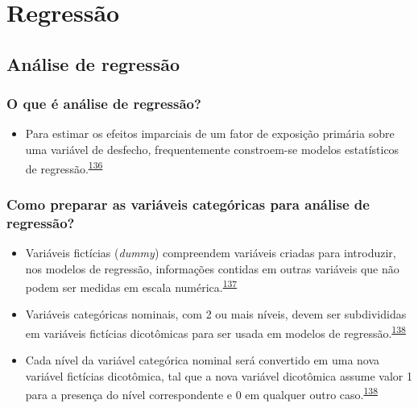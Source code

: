 \documentclass[
  a4paper,
]{book}
\providecommand{\tightlist}{%
  \setlength{\itemsep}{0pt}\setlength{\parskip}{0pt}}
\begin{document}
\hypertarget{analise-inferencial-regressao}{%
\chapter{\texorpdfstring{\textbf{Regressão}}{Regressão}}\label{analise-inferencial-regressao}}

\hypertarget{analise-regressao}{%
\section{Análise de regressão}\label{analise-regressao}}

\hypertarget{o-que-uxe9-anuxe1lise-de-regressuxe3o}{%
\subsection{O que é análise de regressão?}\label{o-que-uxe9-anuxe1lise-de-regressuxe3o}}

\begin{itemize}
\tightlist
\item
  Para estimar os efeitos imparciais de um fator de exposição primária sobre uma variável de desfecho, frequentemente constroem-se modelos estatísticos de regressão.\textsuperscript{\protect\hyperlink{ref-bandoli2018}{136}}
\end{itemize}

\hypertarget{como-preparar-as-variuxe1veis-categuxf3ricas-para-anuxe1lise-de-regressuxe3o}{%
\subsection{Como preparar as variáveis categóricas para análise de regressão?}\label{como-preparar-as-variuxe1veis-categuxf3ricas-para-anuxe1lise-de-regressuxe3o}}

\begin{itemize}
\item
  Variáveis fictícias (\emph{dummy}) compreendem variáveis criadas para introduzir, nos modelos de regressão, informações contidas em outras variáveis que não podem ser medidas em escala numérica.\textsuperscript{\protect\hyperlink{ref-suits1957}{137}}
\item
  Variáveis categóricas nominais, com 2 ou mais níveis, devem ser subdivididas em variáveis fictícias dicotômicas para ser usada em modelos de regressão.\textsuperscript{\protect\hyperlink{ref-Healy1995}{138}}
\item
  Cada nível da variável categórica nominal será convertido em uma nova variável fictícias dicotômica, tal que a nova variável dicotômica assume valor 1 para a presença do nível correspondente e 0 em qualquer outro caso.\textsuperscript{\protect\hyperlink{ref-Healy1995}{138}}
\end{itemize}
\end{document}

